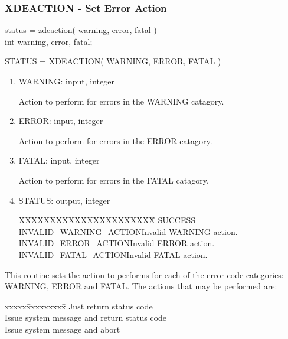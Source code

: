 \subsubsection{XDEACTION - Set Error Action}
\begin{tabbing}
status = \=zdeaction( warning, error, fatal )\\
\>int  warning, error, fatal;\\
\end{tabbing}
STATUS = XDEACTION( WARNING, ERROR, FATAL )
\begin{enumerate}
\item WARNING:  input, integer

Action to perform for errors in the WARNING catagory.
\item ERROR:  input, integer

Action to perform for errors in the ERROR catagory.
\item FATAL:  input, integer

Action to perform for errors in the FATAL catagory.
\item STATUS:  output, integer
\begin{tabbing}
XXXXXXXXXXXXXXXXXXXXXX\=\kill
SUCCESS\\
INVALID\_WARNING\_ACTION\>Invalid WARNING action.\\
INVALID\_ERROR\_ACTION\>Invalid ERROR action.\\
INVALID\_FATAL\_ACTION\>Invalid FATAL action.\\
\end{tabbing}
\end{enumerate}
This routine sets the action to performs for each of the error code
categories:  WARNING, ERROR and FATAL.  The actions that may be
performed are:
\begin{tabbing}
xxxxx\=xxxxxxxxx\=\kill
{}\>Just return status code\\
\>Issue system message and return status code\\
\>Issue system message and abort\\
\end{tabbing}
\newpage
